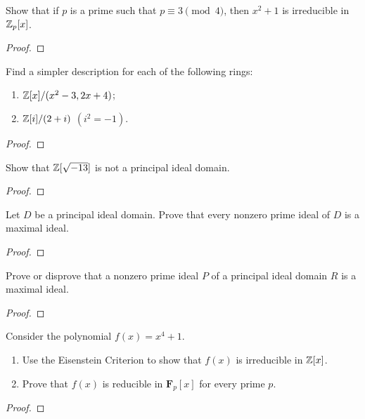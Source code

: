 \begin{problem}
Show that if $p$ is a prime such that $p\equiv 3\pmod{4}$, then $x^2+1$ is
irreducible in $\mathbb{Z}_p[x]$.
\end{problem}
\begin{proof}
\end{proof}

\begin{problem}
Find a simpler description for each of the following rings:
\begin{enumerate}
\item $\mathbb{Z}[x]/(x^2-3,2x+4)$;
\item $\mathbb{Z}[i]/(2+i)$ $(i^2=-1)$.
\end{enumerate}
\end{problem}
\begin{proof}
\end{proof}

\begin{problem}
Show that $\mathbb{Z}[\sqrt{-13}]$ is not a principal ideal domain.
\end{problem}
\begin{proof}
\end{proof}

\begin{problem}
Let $D$ be a principal ideal domain. Prove that every nonzero prime ideal
of $D$ is a maximal ideal.
\end{problem}
\begin{proof}
\end{proof}

\begin{problem}
Prove or disprove that a nonzero prime ideal $P$ of a principal ideal
domain $R$ is a maximal ideal.
\end{problem}
\begin{proof}
\end{proof}

\begin{problem}
Consider the polynomial $f(x)=x^4+1$.
\begin{enumerate}[label=(\alph*)]
\item Use the Eisenstein Criterion to show that $f(x)$ is irreducible in
  $\mathbb{Z}[x]$.
\item Prove that $f(x)$ is reducible in $\mathbf{F}_p[x]$ for every prime
  $p$.
\end{enumerate}
\end{problem}
\begin{proof}
\end{proof}

